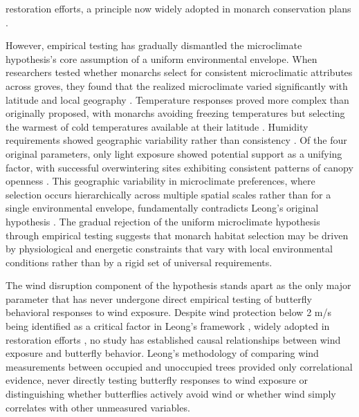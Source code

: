 restoration efforts, a principle now widely adopted in monarch conservation plans \parencite{xercessocietyStateMonarchOverwintering2016,jepsenProtectingCaliforniasButterfly2017,peltonMonarchButterflyOverwintering2020,weissRecommendationsRestorationMonarch2008,althouse&meadeinc.EllwoodMesaSperling2023}.

However, empirical testing has gradually dismantled the microclimate hypothesis's core assumption of a uniform environmental envelope. When researchers tested whether monarchs select for consistent microclimatic attributes across groves, they found that the realized microclimate varied significantly with latitude and local geography \parencite{sanieeHierarchyScaleInfluence2022}. Temperature responses proved more complex than originally proposed, with monarchs avoiding freezing temperatures but selecting the warmest of cold temperatures available at their latitude \parencite{fisherClimaticNicheModel2018}. Humidity requirements showed geographic variability rather than consistency \parencite{sanieeHierarchyScaleInfluence2022}. Of the four original parameters, only light exposure showed potential support as a unifying factor, with successful overwintering sites exhibiting consistent patterns of canopy openness \parencite{sanieeHierarchyScaleInfluence2022,weissForestCanopyStructure1991}. This geographic variability in microclimate preferences, where selection occurs hierarchically across multiple spatial scales rather than for a single environmental envelope, fundamentally contradicts Leong's original hypothesis \parencite{fisherClimaticNicheModel2018,sanieeHierarchyScaleInfluence2022}. The gradual rejection of the uniform microclimate hypothesis through empirical testing suggests that monarch habitat selection may be driven by physiological and energetic constraints that vary with local environmental conditions rather than by a rigid set of universal requirements.

The wind disruption component of the hypothesis stands apart as the only major parameter that has never undergone direct empirical testing of butterfly behavioral responses to wind exposure. Despite wind protection below 2 m/s being identified as a critical factor in Leong's framework \parencite{leongEvaluationManagementCalifornia2016}, widely adopted in restoration efforts \parencite{xercessocietyManagingMonarchsWest2018,jepsenProtectingCaliforniasButterfly2017,althouse&meadeinc.EllwoodMesaSperling2023,u.s.fishandwildlifeserviceMonarchDanausPlexippus2024,weissAlbanyHillMonarch2018}, no study has established causal relationships between wind exposure and butterfly behavior. Leong's methodology of comparing wind measurements between occupied and unoccupied trees provided only correlational evidence, never directly testing butterfly responses to wind exposure or distinguishing whether butterflies actively avoid wind or whether wind simply correlates with other unmeasured variables.

